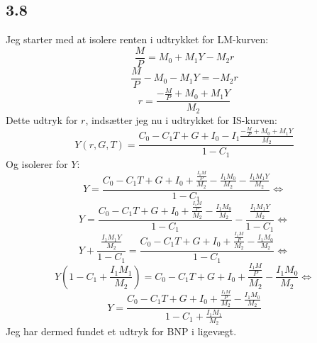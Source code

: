 \documentclass{article}
\begin{document}
\subsection*{3.8}
Jeg starter med at isolere renten i udtrykket for LM-kurven:
\begin{equation}
    \frac{M}{P}=M_0+M_1 Y-M_2 r
\end{equation}
\begin{equation}
    \frac{M}{P}-M_0-M_1 Y=-M_2 r
\end{equation}
\begin{equation}
    r = \frac{-\frac{M}{P}+M_0+M_1 Y}{M_2}
\end{equation}
Dette udtryk for $r$, indsætter jeg nu i udtrykket for IS-kurven:
\begin{equation}
    Y(r, G, T)=\frac{C_0-C_1 T+G+I_0-I_1 \frac{-\frac{M}{P}+M_0+M_1 Y}{M_2}}{1-C_1}
\end{equation}
Og isolerer for $Y$:
\begin{equation}
    Y=\frac{C_0-C_1 T+G+I_0+\frac{\frac{I_1 M}{P}}{M_2}-\frac{I_1 M_0}{M_2}-\frac{I_1 M_1 Y}{M_2}}{1-C_1} \Leftrightarrow
\end{equation}
\begin{equation}
    Y=\frac{C_0-C_1 T+G+I_0+\frac{\frac{I_1 M}{P}}{M_2}-\frac{I_1 M_0}{M_2}}{1-C_1}-\frac{\frac{I_1 M_1 Y}{M_2}}{1-C_1} \Leftrightarrow
\end{equation}
\begin{equation}
    Y+\frac{\frac{I_1 M_1 Y}{M_2}}{1-C_1}=\frac{C_0-C_1 T+G+I_0+\frac{\frac{I_1 M}{P}}{M_2}-\frac{I_1 M_0}{M_2}}{1-C_1} \Leftrightarrow
\end{equation}
\begin{equation}
    Y\left(1-C_1+\frac{I_1 M_1}{M_2}\right)=C_0-C_1 T+G+I_0+\frac{\frac{I_1 M}{P}}{M_2}-\frac{I_1 M_0}{M_2} \Leftrightarrow
\end{equation}
\begin{equation}
    Y=\frac{C_0-C_1 T+G+I_0+\frac{\frac{I_1 M}{P}}{M_2}-\frac{I_1 M_0}{M_2}}{1-C_1+\frac{I_1 M_1}{M_2}}
\end{equation}
Jeg har dermed fundet et udtryk for BNP i ligevægt. 
\end{document}
